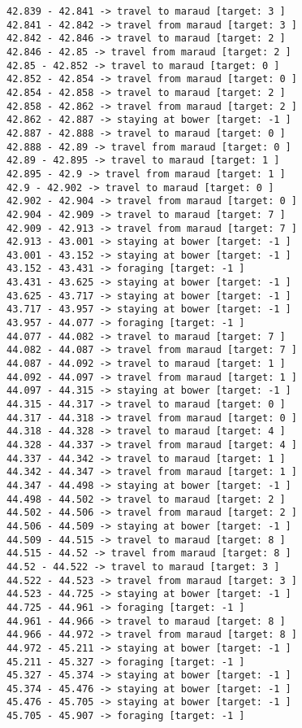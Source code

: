 \documentclass[11pt]{article}
\begin{document}
\begin{Verbatim}[commandchars=\\\{\}]
42.839 - 42.841 -> travel to maraud [target: 3 ]
42.841 - 42.842 -> travel from maraud [target: 3 ]
42.842 - 42.846 -> travel to maraud [target: 2 ]
42.846 - 42.85 -> travel from maraud [target: 2 ]
42.85 - 42.852 -> travel to maraud [target: 0 ]
42.852 - 42.854 -> travel from maraud [target: 0 ]
42.854 - 42.858 -> travel to maraud [target: 2 ]
42.858 - 42.862 -> travel from maraud [target: 2 ]
42.862 - 42.887 -> staying at bower [target: -1 ]
42.887 - 42.888 -> travel to maraud [target: 0 ]
42.888 - 42.89 -> travel from maraud [target: 0 ]
42.89 - 42.895 -> travel to maraud [target: 1 ]
42.895 - 42.9 -> travel from maraud [target: 1 ]
42.9 - 42.902 -> travel to maraud [target: 0 ]
42.902 - 42.904 -> travel from maraud [target: 0 ]
42.904 - 42.909 -> travel to maraud [target: 7 ]
42.909 - 42.913 -> travel from maraud [target: 7 ]
42.913 - 43.001 -> staying at bower [target: -1 ]
43.001 - 43.152 -> staying at bower [target: -1 ]
43.152 - 43.431 -> foraging [target: -1 ]
43.431 - 43.625 -> staying at bower [target: -1 ]
43.625 - 43.717 -> staying at bower [target: -1 ]
43.717 - 43.957 -> staying at bower [target: -1 ]
43.957 - 44.077 -> foraging [target: -1 ]
44.077 - 44.082 -> travel to maraud [target: 7 ]
44.082 - 44.087 -> travel from maraud [target: 7 ]
44.087 - 44.092 -> travel to maraud [target: 1 ]
44.092 - 44.097 -> travel from maraud [target: 1 ]
44.097 - 44.315 -> staying at bower [target: -1 ]
44.315 - 44.317 -> travel to maraud [target: 0 ]
44.317 - 44.318 -> travel from maraud [target: 0 ]
44.318 - 44.328 -> travel to maraud [target: 4 ]
44.328 - 44.337 -> travel from maraud [target: 4 ]
44.337 - 44.342 -> travel to maraud [target: 1 ]
44.342 - 44.347 -> travel from maraud [target: 1 ]
44.347 - 44.498 -> staying at bower [target: -1 ]
44.498 - 44.502 -> travel to maraud [target: 2 ]
44.502 - 44.506 -> travel from maraud [target: 2 ]
44.506 - 44.509 -> staying at bower [target: -1 ]
44.509 - 44.515 -> travel to maraud [target: 8 ]
44.515 - 44.52 -> travel from maraud [target: 8 ]
44.52 - 44.522 -> travel to maraud [target: 3 ]
44.522 - 44.523 -> travel from maraud [target: 3 ]
44.523 - 44.725 -> staying at bower [target: -1 ]
44.725 - 44.961 -> foraging [target: -1 ]
44.961 - 44.966 -> travel to maraud [target: 8 ]
44.966 - 44.972 -> travel from maraud [target: 8 ]
44.972 - 45.211 -> staying at bower [target: -1 ]
45.211 - 45.327 -> foraging [target: -1 ]
45.327 - 45.374 -> staying at bower [target: -1 ]
45.374 - 45.476 -> staying at bower [target: -1 ]
45.476 - 45.705 -> staying at bower [target: -1 ]
45.705 - 45.907 -> foraging [target: -1 ]

\end{Verbatim}
\end{document}
